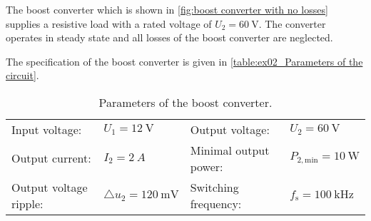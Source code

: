 

The boost converter which is shown in \autoref{fig:boost converter with no losses} supplies a resistive load with a rated voltage of $U_{\mathrm{2}} = \SI{60}{\volt}$. The converter operates in steady state and all losses of the boost converter are neglected.



The specification of the boost converter is given in \autoref{table:ex02_Parameters of the circuit}.

\begin{table}[ht]
    \centering  %
    \begin{tabular}{llll}
        \toprule
        
        Input voltage: &  $U_{\mathrm{1}} = \SI{12}{\volt}$ & Output voltage: & $U_{\mathrm{2}} = \SI{60}{\volt}$ \\ 
        Output current: & $I_2 = \SI{2}{A}$  & Minimal output power: & $P_{\mathrm{2,min}} = \SI{10}{\watt}$ \\ 
        Output voltage ripple: & $\triangle u_{\mathrm{2}} = \SI{120}{\milli\volt}$  & Switching frequency: & $f_{\mathrm{s}} = \SI{100}{\kilo\hertz}$ \\ 
        \bottomrule
    \end{tabular}
    \caption{Parameters of the boost converter.}  %
    \label{table:ex02_Parameters of the circuit}
\end{table}
%

